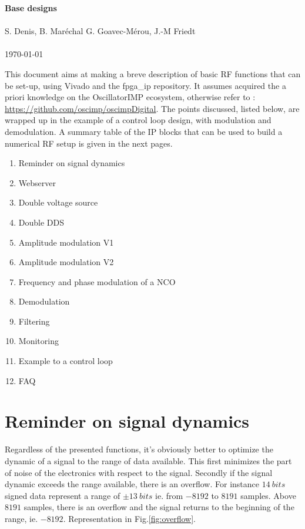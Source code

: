 \documentclass[12pt,oneside]{article}
\begin{document}
\begin{center}
{\bf \Large Base designs} \\ \ \\
S. Denis, B. Maréchal G. Goavec-M\'erou, J.-M Friedt \\ \ \\ \today
\end{center}

This document aims at making a breve description of basic RF functions that can be set-up, using Vivado and the fpga\_ip repository. It assumes acquired the a priori knowledge on the OscillatorIMP ecosystem, otherwise refer to : \href{[https://github.com/oscimp/oscimpDigital]}{https://github.com/oscimp/oscimpDigital}.
The points discussed, listed below, are wrapped up in the example of a control loop design, with modulation and demodulation. A summary table of the IP blocks that can be used to build a numerical RF setup is given in the next pages. 

\begin{multicols}{2}
\begin{enumerate}
\setlength\itemsep{-0.1cm}
\item Reminder on signal dynamics
\item Webserver
\item Double voltage source
\item Double DDS
\item Amplitude modulation V1
\item Amplitude modulation V2
\item Frequency and phase modulation of a NCO
\item Demodulation
\item Filtering
\item Monitoring
\item Example to a control loop
\item FAQ
\end{enumerate}
\end{multicols}


\section{Reminder on signal dynamics}

Regardless of the presented functions, it's obviously better to optimize the dynamic of a signal to the range of data available. This first minimizes the part of noise of the electronics with respect to the signal. Secondly if the signal dynamic exceeds the range available, there is an overflow. For instance $14~bits$ signed data represent a range of $\pm 13~bits$ ie. from $-8192$ to $8191$ samples. Above $8191$ samples, there is an overflow and the signal returns to the beginning of the range, ie. $-8192$. Representation in Fig.\ref{fig:overflow}.
\end{document}
